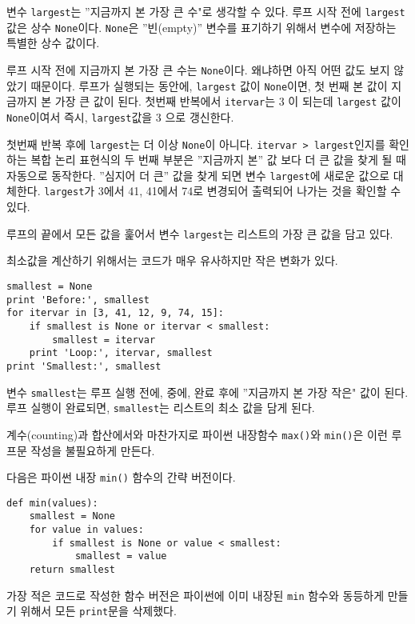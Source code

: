 변수 {\tt largest}는 ''지금까지 본 가장 큰 수"로 생각할 수 있다.
루프 시작 전에 {\tt largest} 값은 상수 {\tt None}이다.
{\tt None}은 ''빈(empty)'' 변수를 표기하기 위해서 변수에 저장하는 특별한 상수 값이다.

루프 시작 전에 지금까지 본 가장 큰 수는 {\tt None}이다. 
왜냐하면 아직 어떤 값도 보지 않았기 때문이다.
루프가 실행되는 동안에, {\tt largest} 값이 {\tt None}이면, 첫 번째 본 값이 지금까지 본 가장 큰 값이 된다.
첫번째 반복에서 {\tt itervar}는 3 이 되는데 {\tt largest} 값이 {\tt None}이여서 즉시, {\tt largest}값을 3 으로 갱신한다.

첫번째 반복 후에 {\tt largest}는 더 이상 {\tt None}이 아니다. 
{\tt itervar > largest}인지를 확인하는 복합 논리 표현식의 두 번째 부분은 ''지금까지 본'' 값 보다 더 큰 값을 찾게 될 때 자동으로 동작한다.
''심지어 더 큰'' 값을 찾게 되면 변수 {\tt largest}에 새로운 값으로 대체한다.
{\tt largest}가 3에서 41, 41에서 74로 변경되어 출력되어 나가는 것을 확인할 수 있다.

루프의 끝에서 모든 값을 훑어서 변수 {\tt largest}는 리스트의 가장 큰 값을 담고 있다.

최소값을 계산하기 위해서는 코드가 매우 유사하지만 작은 변화가 있다.

\beforeverb
\begin{verbatim}
smallest = None
print 'Before:', smallest
for itervar in [3, 41, 12, 9, 74, 15]:
    if smallest is None or itervar < smallest:
        smallest = itervar
    print 'Loop:', itervar, smallest
print 'Smallest:', smallest
\end{verbatim}
\afterverb
%

변수 {\tt smallest}는 루프 실행 전에, 중에, 완료 후에 ''지금까지 본 가장 작은" 값이 된다.
루프 실행이 완료되면, {\tt smallest}는 리스트의 최소 값을 담게 된다.

계수(counting)과 합산에서와 마찬가지로 파이썬 내장함수 {\tt max()}와 {\tt min()}은 이런 루프문 작성을 불필요하게 만든다.

다음은 파이썬 내장 {\tt min()} 함수의 간략 버전이다.

\beforeverb
\begin{verbatim}
def min(values):
    smallest = None
    for value in values:
        if smallest is None or value < smallest:
            smallest = value
    return smallest
\end{verbatim}
\afterverb
%

가장 적은 코드로 작성한 함수 버전은 파이썬에 이미 내장된 {\tt min} 함수와 동등하게 만들기 위해서 모든 {\tt print}문을 삭제했다.

